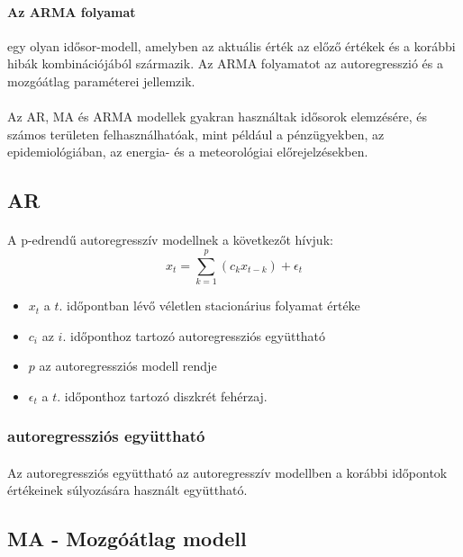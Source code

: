 \documentclass[11pt,a4paper]{article}
\begin{document}
				\paragraph{Az ARMA folyamat}
					egy olyan idősor-modell, amelyben az aktuális érték az előző értékek és a korábbi hibák kombinációjából származik. Az ARMA folyamatot az autoregresszió és a mozgóátlag paraméterei jellemzik.
				\paragraph{}
					Az AR, MA és ARMA modellek gyakran használtak idősorok elemzésére, és számos területen felhasználhatóak, mint például a pénzügyekben, az epidemiológiában, az energia- és a meteorológiai előrejelzésekben.
				\subsection{AR}
					\paragraph{}
						A p-edrendű autoregresszív modellnek a következőt hívjuk:
						$$x_t = \sum_{k=1}^{p}(c_k x_{t-k}) + \epsilon_t$$
						\begin{itemize}
							\item $x_t$ a $t.$ időpontban lévő véletlen stacionárius folyamat értéke
							\item $c_i$ az $i.$ időponthoz tartozó autoregressziós együttható
							\item $p$ az autoregressziós modell rendje
							\item $\epsilon_t$ a $t.$ időponthoz tartozó diszkrét fehérzaj.
						\end{itemize}
					\subsubsection{autoregressziós együttható}
						\paragraph{}
							Az autoregressziós együttható az autoregresszív modellben a korábbi időpontok értékeinek súlyozására használt együttható.
				\subsection{MA - Mozgóátlag modell}
\end{document}
